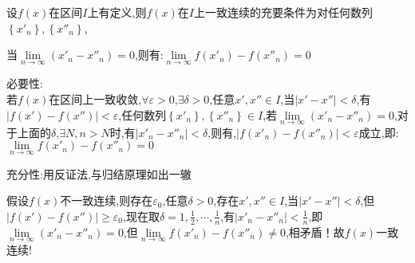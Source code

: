 \documentclass{ctexart}
\begin{document}
\begin{tcolorbox}[title = {f(x)一致连续的充要条件},colbacktitle=green!35!black,colback=green!1,arc = 3mm, outer arc = 3mm,fonttitle = \itshape, fontupper = \itshape, fontlower = \itshape]
	   设$f(x)$在区间$I$上有定义,则$f(x)$在$I$上一致连续的充要条件为对任何数列$\left\{x'_{n}\right\},\left\{x''_{n}\right\}$,
	   
	   当$\lim\limits_{n \to \infty}\left(x'_{n}-x''_{n} \right) =0$,则有:$\lim\limits_{n \to \infty}f(x'_{n})-f(x''_{n})=0$
	   
	   \tcblower
	   {\color{red}必要性:}\\若$f(x)$在区间上一致收敛,$\forall \varepsilon>0$,$\exists \delta >0$,任意$x',x'' \in I$,当$\left|x'-x''\right|<\delta$,有$\left|f(x')-f(x'')\right|< \varepsilon$,任何数列$\left\{x'_{n}\right\},\left\{x''_{n}\right\} \in I$,若$\lim\limits_{n \to \infty}\left(x'_{n}-x''_{n} \right) =0$,对于上面的$\delta$,$\exists N,n>N$时,有$\left|x'_{n}-x''_{n}\right|< \delta$,则有,$\left|f(x'_{n})-f(x''_{n})\right|< \varepsilon$成立,即:$\lim\limits_{n \to \infty}f(x'_{n})-f(x''_{n})=0$
	   
	   {\color{red}充分性:用反证法,与归结原理如出一辙} 
	   
	   假设$f(x)$不一致连续,则存在$\varepsilon_{0}$,任意$\delta>0$,存在$x',x'' \in I$,当$\left|x'-x''\right|< \delta$,但$\left |f(x')-f(x'')\right| 
	   \ge \varepsilon_{0}$,现在取$\displaystyle{\delta=1,\frac{1}{2},\cdots,\frac{1}{n}}$,有$\left|x'_{n}-x''_{n}\right|< \frac{1}{n}$,即$\lim\limits_{n \to \infty}\left(x'_{n}-x''_{n} \right) =0$,但$\lim\limits_{n \to \infty}f(x'_{n})-f(x''_{n})\ne 0$,相矛盾！故$f(x)$一致连续!
	\end{tcolorbox}
	   
\end{document}
